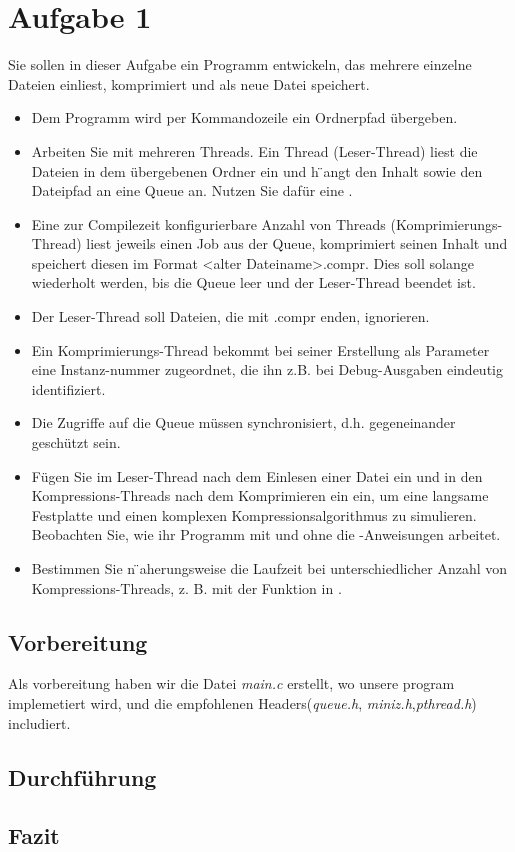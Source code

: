 \section{Aufgabe 1}
Sie sollen in dieser Aufgabe ein Programm entwickeln, das mehrere einzelne Dateien einliest,
komprimiert und als neue Datei speichert.
\begin{itemize}
	\item Dem Programm wird per Kommandozeile ein Ordnerpfad übergeben.
	\item Arbeiten Sie mit mehreren Threads. Ein Thread (Leser-Thread) liest die Dateien in dem
	übergebenen Ordner ein und h ̈angt den Inhalt sowie den Dateipfad an eine Queue an.
	Nutzen Sie dafür eine .
	\item Eine zur Compilezeit konfigurierbare Anzahl von Threads (Komprimierungs-Thread) liest
	jeweils einen Job aus der Queue, komprimiert seinen Inhalt und speichert diesen
	im Format <alter Dateiname>.compr. Dies soll solange wiederholt werden,
	bis die Queue leer und der Leser-Thread beendet ist.
	\item Der Leser-Thread soll Dateien, die mit .compr enden, ignorieren.
	\item Ein Komprimierungs-Thread bekommt bei seiner Erstellung als Parameter eine
	Instanz-nummer zugeordnet, die ihn z.B. bei Debug-Ausgaben eindeutig identifiziert.
	\item Die Zugriffe auf die Queue müssen synchronisiert, d.h. gegeneinander geschützt sein.
	\item  Fügen Sie im Leser-Thread nach dem Einlesen einer Datei ein  und in den
	Kompressions-Threads nach dem Komprimieren ein   ein, um eine langsame Festplatte
	und einen komplexen Kompressionsalgorithmus zu simulieren. Beobachten Sie, wie ihr Programm mit
	und ohne die -Anweisungen arbeitet.
	\item Bestimmen Sie n ̈aherungsweise die Laufzeit bei unterschiedlicher Anzahl von
	Kompressions-Threads, z. B. mit der Funktion  in .

\end{itemize}
	\subsection{Vorbereitung}
	Als vorbereitung haben wir die Datei \textit{main.c} erstellt, wo unsere program implemetiert wird,
	und die empfohlenen Headers(\textit{queue.h}, \textit{miniz.h},\textit{pthread.h}) includiert.
	\subsection{Durchführung}

	\subsection{Fazit}

\newpage
